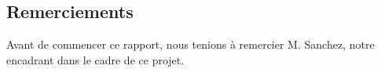 \documentclass[a4paper,11pt,twoside]{article}
\begin{document}
\dosecttoc{} %
\cleardoublepage


\thispagestyle{empty} %
\subsection*{Remerciements}
Avant de commencer ce rapport, nous tenions à remercier M. Sanchez, notre encadrant dans le cadre de ce projet.
\clearpage

\thispagestyle{empty} %
\setcounter{secnumdepth}{3}
\tableofcontents
\clearpage

\setcounter{page}{1}



\clearpage

\clearpage

\clearpage

\clearpage


\clearpage



\clearpage

\clearpage
\appendix
\renewcommand{\stctitle}{}                          %
\renewcommand\thesubsection{A\arabic{subsection}}   %
\renewcommand{\stcSSfont}{}                         %

\secttoc
\clearpage
{}




\end{document}
